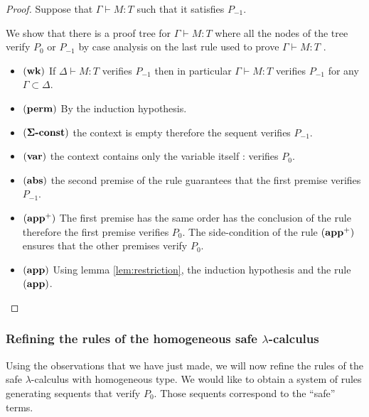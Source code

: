 \begin{proof}
Suppose that $\Gamma \vdash M : T$ such that it satisfies $P_{-1}$.

We show that there is a proof tree for
$\Gamma \vdash M : T$ where all the nodes of the tree verify $P_0$
or $P_{-1}$ by case analysis on the last rule used to prove $\Gamma \vdash M : T$ .

\begin{itemize}
\item $\mathbf{(wk)}$ If $\Delta \vdash M : T$ verifies $P_{-1}$ then in particular $\Gamma
\vdash M : T$ verifies $P_{-1}$ for any $\Gamma \subset \Delta$.

\item $\mathbf{(perm)}$ By the induction hypothesis.

\item $\mathbf{(\Sigma\mbox{\textbf{-const}})}$ the context is empty therefore the sequent verifies $P_{-1}$.

\item $\mathbf{(var)}$ the context contains only the variable itself : verifies $P_0$.

\item $\mathbf{(abs)}$ the second premise of the rule guarantees that the first
premise verifies $P_{-1}$.

\item $\mathbf{(app^+)}$ The first premise has the same order has the
conclusion of the rule therefore the first premise verifies
$P_0$. The side-condition of the rule $\mathbf{(app^+)}$ ensures that the other premises verify $P_0$.

\item $\mathbf{(app)}$ Using lemma \ref{lem:restriction}, the induction hypothesis and the rule $\mathbf{(app)}$.

\end{itemize}
\end{proof}

\subsubsection{Refining the rules of the homogeneous safe $\lambda$-calculus}

Using the observations that we have just made, we will now refine the rules
of the safe $\lambda$-calculus with homogeneous type. We would like to obtain a system
of rules generating sequents that verify $P_0$. Those sequents correspond to the ``safe'' terms.


